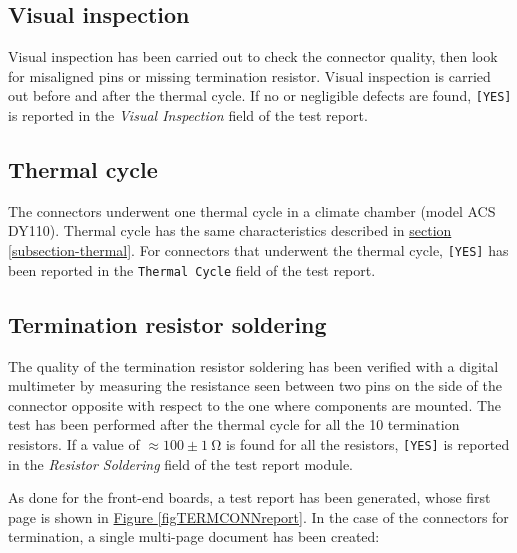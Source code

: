 \subsection{Visual inspection}
Visual inspection has been carried out to check the connector quality, then look for misaligned pins or missing termination resistor. Visual inspection is carried out before and after the thermal cycle. If no or negligible defects are found, \texttt{[YES]} is reported in the \textit{Visual Inspection} field of the test report.

\subsection{Thermal cycle}
The connectors underwent one thermal cycle in a climate chamber (model ACS DY110). Thermal cycle has the same characteristics described in \hyperref[subsection-thermal]{section \ref{subsection-thermal}}. For connectors that underwent the thermal cycle, \texttt{[YES]} has been reported in the \texttt{Thermal Cycle} field of the test report.

\subsection{Termination resistor soldering}
The quality of the termination resistor soldering has been verified with a digital multimeter by measuring the resistance seen between two pins on the side of the connector opposite with respect to the one where components are mounted. The test has been performed after the thermal cycle for all the 10 termination resistors. If a value of $\approx100\pm\SI{1}{\ohm}$ is found for all the resistors, \texttt{[YES]} is reported in the \textit{Resistor Soldering} field of the test report module.

\par
As done for the front-end boards, a test report has been generated, whose first page is shown in \hyperref[figTERMCONNreport]{Figure \ref{figTERMCONNreport}}. In the case of the connectors for termination, a single multi-page document has been created:

